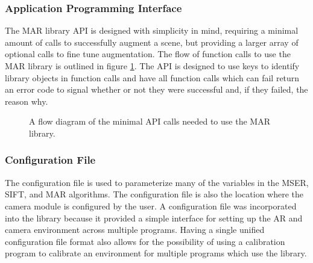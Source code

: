 \documentclass[oneside,11pt]{Latex/Classes/PhDthesisPSnPDF}
\begin{document}
\subsubsection{Application Programming Interface}

The MAR library API is designed with simplicity in mind, requiring a minimal amount of calls to successfully augment a scene, but providing a larger array of optional calls to fine tune augmentation.  The flow of function calls to use the MAR library is outlined in figure \ref{fig_mar_api_calls}.  The API is designed to use keys to identify library objects in function calls and have all function calls which can fail return an error code to signal whether or not they were successful and, if they failed, the reason why.

\begin{figure}[h!]
  \caption{\label{fig_mar_api_calls} A flow diagram of the minimal API calls needed to use the MAR library.}
\end{figure}

\subsubsection{Configuration File}

The configuration file is used to parameterize many of the variables in the MSER, SIFT, and MAR algorithms.  The configuration file is also the location where the camera module is configured by the user.  A configuration file was incorporated into the library because it provided a simple interface for setting up the AR and camera environment across multiple programs.  Having a single unified configuration file format also allows for the possibility of using a calibration program to calibrate an environment for multiple programs which use the library.
\end{document}

